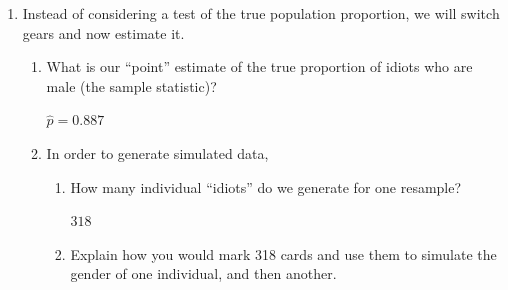 \begin{enumerate}
\begin{enumerate}
\begin{key}
{\it It's much bigger than any of the points I generated. The largest
  one I got was 0.585 or 186 males out of 318.}
\end{key} 
\item  How strong is the evidence against the null hypothesis?  What
  do you think about the idea that idiots are half male?
\begin{students}
    \vspace{2cm}    
\end{students}

\begin{key}
  {\it Extremely strong evidence, the p-value is less than 1 in
    1000. The null hypothesis of only half males is not 
    supported by these data. I conclude that there are more male idiots
  than female idiots.  } 
\end{key}


\end{enumerate}

\item Instead of considering a test of the true population proportion, we
  will switch gears and now estimate it.
  \begin{enumerate}
    \item What is our ``point'' estimate of the
      true proportion of idiots who are male (the sample statistic)?
\begin{students}
    \vspace{.4cm}    
\end{students}

\begin{key}
$\widehat{p} = 0.887$
\end{key}
    \item In order to generate simulated data,
      \begin{enumerate}
        \item How many individual ``idiots'' do we generate for one
          resample?
\begin{students}
    \vspace{.8cm}    
\end{students}

\begin{key} 
$318$
\end{key}
       \item Explain how you would mark 318 cards and use them to
         simulate the gender of one individual, and then another.
\begin{students}
    \vspace{2.5cm}    
\end{students}


\end{enumerate}
\end{enumerate}
\end{enumerate}
